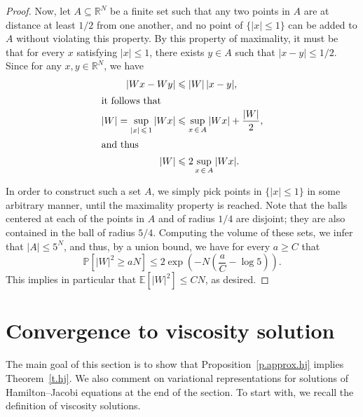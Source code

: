 \documentclass[AHL,Unicode,longabstracts,published]{cedram}
\newcommand{\R}{\mathbb{R}}
\newcommand{\E}{\mathbb{E}}
\renewcommand{\P}{\mathbb{P}}
\newcommand{\1}{\mathds{1}}
\renewcommand{\le}{\leqslant}
\renewcommand{\ge}{\geqslant}
\renewcommand{\subset}{\subseteq}
\begin{document}
\begin{proof}
Now, let $A \subset \R^N$ be a finite set such that any two points in $A$ are at distance at least $1/2$ from one another, and no point of $\{|x|\le 1\}$ can be added to $A$ without violating this property. By this property of maximality, it must be that for every $x$ satisfying $|x|\le 1$, there exists $y \in A$ such that $|x-y|\le 1/2$. Since for any $x,y \in \R^N$, we have
\begin{align*}
\left|Wx - Wy\right| &\le |W| \, |x-y|,
\\
\intertext{it follows that}
|W| = \sup_{|x|\,\le\,1} |Wx| &\le \sup_{x\,\in\,A} |Wx| + \frac{|W|}{2},
\\
\intertext{and thus}
|W| &\le 2 \sup_{x\,\in\,A} |Wx|.
\end{align*}

In order to construct such a set $A$, we simply pick points in $\{|x|\le 1\}$ in some arbitrary manner, until the maximality property is reached. Note that the balls centered at each of the points in $A$ and of radius $1/4$ are disjoint; they are also contained in the ball of radius $5/4$. Computing the volume of these sets, we infer that $|A| \le 5^N$, and thus, by a union bound, we have for every $a \ge C$ that
\[
\P \left[|W|^2 \ge aN \right] \le 2 \exp \left(-N \left(\frac a C - \log 5 \right) \right).
\]
This implies in particular that $\E [|W|^2 ] \le C N$, as desired.
\end{proof}

\section{Convergence to viscosity solution}\label{s.convergence}
The main goal of this section is to show that Proposition~\ref{p.approx.hj} implies Theorem~\ref{t.hj}. We also comment on variational representations for solutions of Hamilton--Jacobi equations at the end of the section. To start with, we recall the definition of viscosity solutions.
\end{document}

